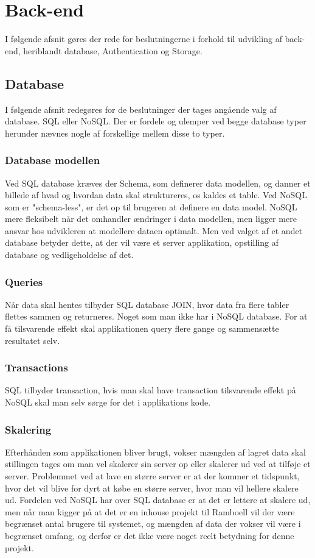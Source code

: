 \section{Back-end}
I følgende afsnit gøres der rede for beslutningerne i forhold til udvikling af back-end, heriblandt database, Authentication og Storage.

\subsection{Database}
I følgende afsnit redegøres for de beslutninger der tages angående valg af database. SQL eller NoSQL.
Der er fordele og ulemper ved begge database typer herunder nævnes nogle af forskellige mellem disse to typer.

\subsubsection{Database modellen}
Ved SQL database kræves der Schema, som definerer data modellen, og danner et billede af hvad og hvordan data skal struktureres, os kaldes et table. Ved NoSQL som er "schema-less", er det op til brugeren at definere en data model. NoSQL mere fleksibelt når det omhandler ændringer i data modellen, men ligger mere ansvar hos udvikleren at modellere dataen optimalt. Men ved valget af et andet database betyder dette, at der vil være et server applikation, opstilling af database og vedligeholdelse af det. 

\subsubsection{Queries}
Når data skal hentes tilbyder SQL database JOIN, hvor data fra flere tabler flettes sammen og returneres. Noget som man ikke har i NoSQL database. For at få tilsvarende effekt skal applikationen query flere gange og sammensætte resultatet selv.  

\subsubsection{Transactions}
SQL tilbyder transaction, hvis man skal have transaction tilsvarende effekt på NoSQL skal man selv sørge for det i applikations kode.
 
\subsubsection{Skalering}
Efterhånden som applikationen bliver brugt, vokser mængden af lagret data skal stillingen tages om man vel skalerer sin server op eller skalerer ud ved at tilføje et server. Problemmet ved at lave en større server er at der kommer et tidspunkt, hvor det vil blive for dyrt at købe en større server, hvor man vil hellere skalere ud. Fordelen ved NoSQL har over SQL database er at det er lettere at skalere ud, men
når man kigger på at det er en inhouse projekt til Ramboell vil der være begrænset antal brugere til systemet, og mængden af data der vokser vil være i begrænset omfang, og derfor er det ikke være noget reelt betydning for denne projekt. 


